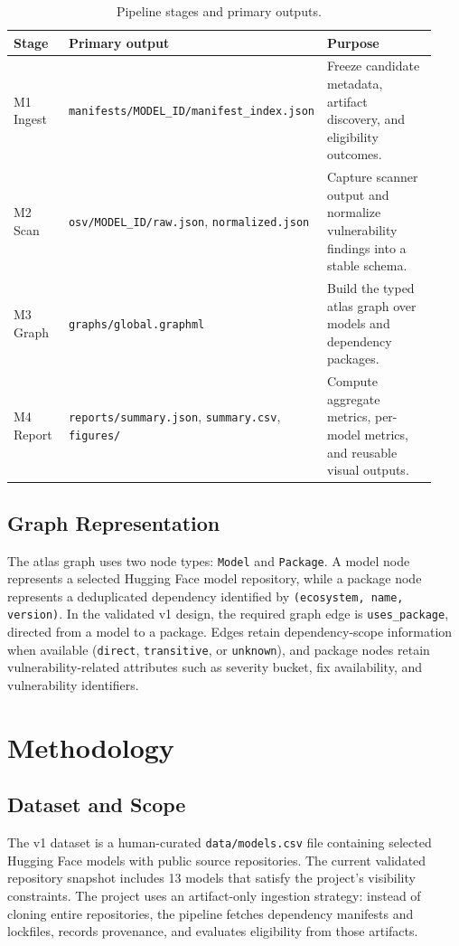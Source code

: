 \documentclass[11pt]{article}
\begin{document}
\begin{table}[H]
\centering
\caption{Pipeline stages and primary outputs.}
\label{tab:pipeline-outputs}
\begin{tabular}{p{0.16\linewidth} p{0.30\linewidth} p{0.47\linewidth}}
\toprule
\textbf{Stage} & \textbf{Primary output} & \textbf{Purpose} \\
\midrule
M1 Ingest & \texttt{manifests/MODEL\_ID/manifest\_index.json} & Freeze candidate metadata, artifact discovery, and eligibility outcomes. \\
M2 Scan & \texttt{osv/MODEL\_ID/raw.json}, \texttt{normalized.json} & Capture scanner output and normalize vulnerability findings into a stable schema. \\
M3 Graph & \texttt{graphs/global.graphml} & Build the typed atlas graph over models and dependency packages. \\
M4 Report & \texttt{reports/summary.json}, \texttt{summary.csv}, \texttt{figures/} & Compute aggregate metrics, per-model metrics, and reusable visual outputs. \\
\bottomrule
\end{tabular}
\end{table}

\subsection{Graph Representation}
The atlas graph uses two node types: \texttt{Model} and \texttt{Package}. A model node represents a selected Hugging Face model repository, while a package node represents a deduplicated dependency identified by \texttt{(ecosystem, name, version)}. In the validated v1 design, the required graph edge is \texttt{uses\_package}, directed from a model to a package. Edges retain dependency-scope information when available (\texttt{direct}, \texttt{transitive}, or \texttt{unknown}), and package nodes retain vulnerability-related attributes such as severity bucket, fix availability, and vulnerability identifiers.

\section{Methodology}

\subsection{Dataset and Scope}
The v1 dataset is a human-curated \texttt{data/models.csv} file containing selected Hugging Face models with public source repositories. The current validated repository snapshot includes 13 models that satisfy the project's visibility constraints. The project uses an artifact-only ingestion strategy: instead of cloning entire repositories, the pipeline fetches dependency manifests and lockfiles, records provenance, and evaluates eligibility from those artifacts.
\end{document}
